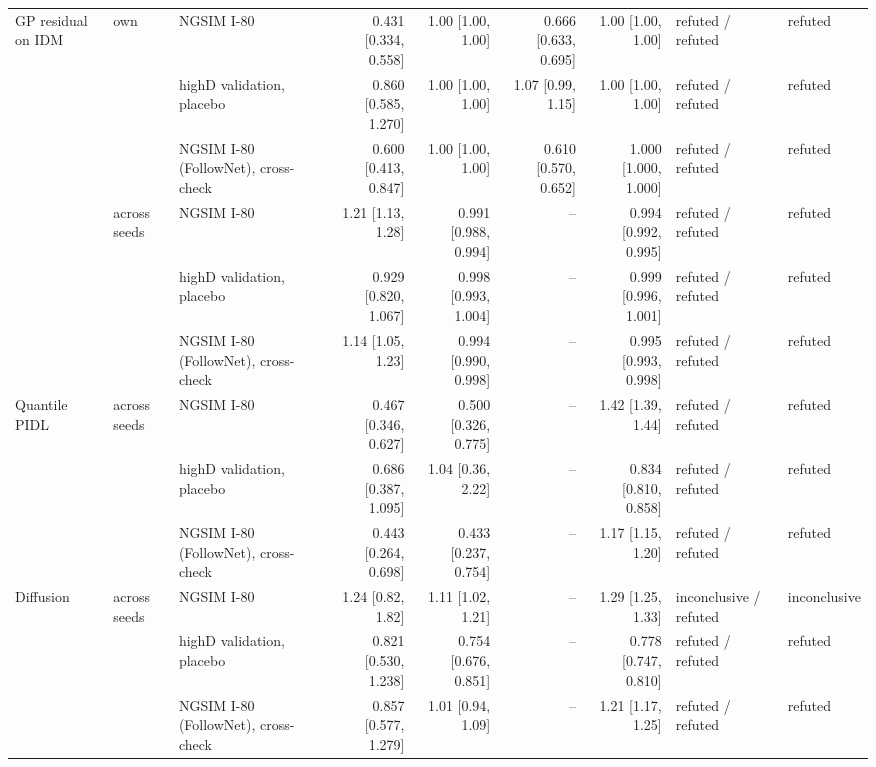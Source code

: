 \begin{table}[htbp]
\begin{tabular}{lllrrrrll}
\midrule
GP residual on IDM & own & NGSIM I-80 & 0.431 [0.334, 0.558] & 1.00 [1.00, 1.00] & 0.666 [0.633, 0.695] & 1.00 [1.00, 1.00] & refuted / refuted & refuted \\
 &  & highD validation, placebo & 0.860 [0.585, 1.270] & 1.00 [1.00, 1.00] & 1.07 [0.99, 1.15] & 1.00 [1.00, 1.00] & refuted / refuted & refuted \\
 &  & NGSIM I-80 (FollowNet), cross-check & 0.600 [0.413, 0.847] & 1.00 [1.00, 1.00] & 0.610 [0.570, 0.652] & 1.000 [1.000, 1.000] & refuted / refuted & refuted \\
\midrule
 & across seeds & NGSIM I-80 & 1.21 [1.13, 1.28] & 0.991 [0.988, 0.994] & -- & 0.994 [0.992, 0.995] & refuted / refuted & refuted \\
 &  & highD validation, placebo & 0.929 [0.820, 1.067] & 0.998 [0.993, 1.004] & -- & 0.999 [0.996, 1.001] & refuted / refuted & refuted \\
 &  & NGSIM I-80 (FollowNet), cross-check & 1.14 [1.05, 1.23] & 0.994 [0.990, 0.998] & -- & 0.995 [0.993, 0.998] & refuted / refuted & refuted \\
\midrule
Quantile PIDL & across seeds & NGSIM I-80 & 0.467 [0.346, 0.627] & 0.500 [0.326, 0.775] & -- & 1.42 [1.39, 1.44] & refuted / refuted & refuted \\
 &  & highD validation, placebo & 0.686 [0.387, 1.095] & 1.04 [0.36, 2.22] & -- & 0.834 [0.810, 0.858] & refuted / refuted & refuted \\
 &  & NGSIM I-80 (FollowNet), cross-check & 0.443 [0.264, 0.698] & 0.433 [0.237, 0.754] & -- & 1.17 [1.15, 1.20] & refuted / refuted & refuted \\
\midrule
Diffusion & across seeds & NGSIM I-80 & 1.24 [0.82, 1.82] & 1.11 [1.02, 1.21] & -- & 1.29 [1.25, 1.33] & inconclusive / refuted & inconclusive \\
 &  & highD validation, placebo & 0.821 [0.530, 1.238] & 0.754 [0.676, 0.851] & -- & 0.778 [0.747, 0.810] & refuted / refuted & refuted \\
 &  & NGSIM I-80 (FollowNet), cross-check & 0.857 [0.577, 1.279] & 1.01 [0.94, 1.09] & -- & 1.21 [1.17, 1.25] & refuted / refuted & refuted \\
\bottomrule
\end{tabular}
\end{table}
